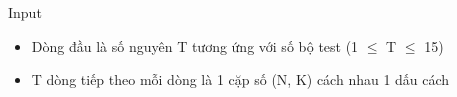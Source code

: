 Input
\begin{itemize}
	\item     Dòng đầu là số nguyên T tương ứng với số bộ test (1  $\le$  T  $\le$  15)   
	\item     T dòng tiếp theo mỗi dòng là 1 cặp số (N, K) cách nhau 1 dấu cách   
\end{itemize}